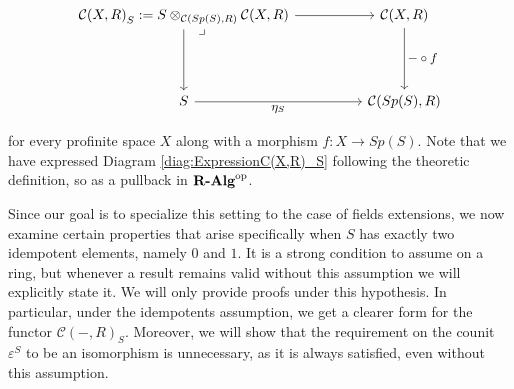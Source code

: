\begin{equation}
\label{diag:ExpressionC(X,R)_S}
    \begin{tikzcd}[every label/.append style = {font = \small}]
        \pullback {\mathcal{C}(X,R)}_S:=S\tens{\mathcal{C}(Sp(S),R)}\mathcal{C}(X,R) \arrow[rr] \arrow[dd] & & \mathcal{C}(X,R) \arrow[dd, "-\circ f"] \\ \\ S \arrow[rr, "\eta_S"'] & & \mathcal{C}(Sp(S),R)
    \end{tikzcd}
\end{equation}

for every profinite space $X$ along with a morphism $f:X\to Sp(S)$. Note that we have expressed Diagram \ref{diag:ExpressionC(X,R)_S} following the theoretic definition, so as a pullback in ${\textbf{R-Alg}}^{\mathrm{op}}$. 

Since our goal is to specialize this setting to the case of fields extensions, we now examine certain properties that arise specifically when $S$ has exactly two idempotent elements, namely $0$ and $1$. It is a strong condition to assume on a ring, but whenever a result remains valid without this assumption we will explicitly state it. We will only provide proofs under this hypothesis. In particular, under the idempotents assumption, we get a clearer form for the functor ${\mathcal{C}(-,R)}_S$. Moreover, we will show that the requirement on the counit $\varepsilon^S$ to be an isomorphism is unnecessary, as it is always satisfied, even without this assumption.

